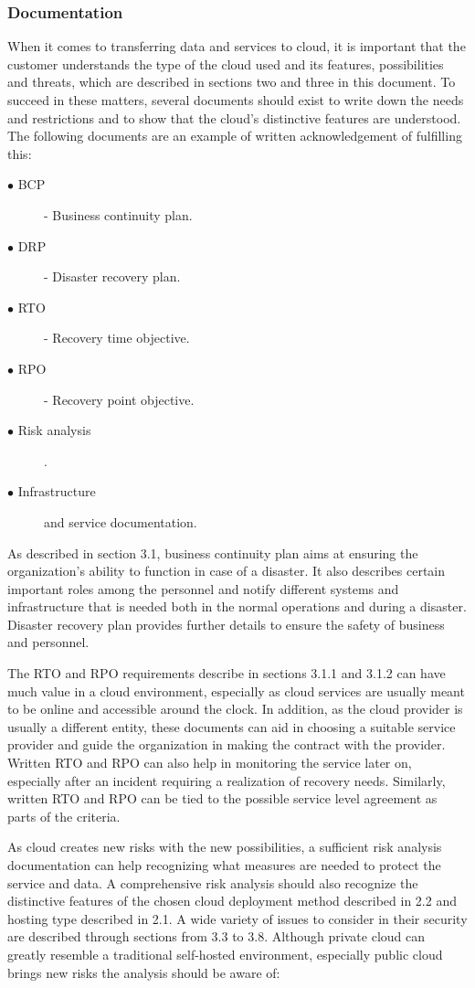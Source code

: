 \documentclass{article}
\begin{document}
\subsubsection{Documentation}
When it comes to transferring data and services to cloud, it is important that the customer understands the type of the cloud used and its features, possibilities and threats, which are described in sections two and three in this document. To succeed in these matters, several documents should exist to write down the needs and restrictions and to show that the cloud's distinctive features are understood. The following documents are an example of written acknowledgement of fulfilling this:
\begin{description}
	\item[$\bullet$ BCP] - Business continuity plan.
	\item[$\bullet$ DRP] - Disaster recovery plan.
	\item[$\bullet$ RTO] - Recovery time objective.
	\item[$\bullet$ RPO] - Recovery point objective.
	\item[$\bullet$ Risk analysis].
	\item[$\bullet$ Infrastructure] and service documentation.
\end{description}
\par
As described in section 3.1, business continuity plan aims at ensuring the organization's ability to function in case of a disaster. It also describes certain important roles among the personnel and notify different systems and infrastructure that is needed both in the normal operations and during a disaster. Disaster recovery plan provides further details to ensure the safety of business and personnel.
\par
The RTO and RPO requirements describe in sections 3.1.1 and 3.1.2 can have much value in a cloud environment, especially as cloud services are usually meant to be online and accessible around the clock. In addition, as the cloud provider is usually a different entity, these documents can aid in choosing a suitable service provider and guide the organization in making the contract with the provider. Written RTO and RPO can also help in monitoring the service later on, especially after an incident requiring a realization of recovery needs. Similarly, written RTO and RPO can be tied to the possible service level agreement as parts of the criteria.
\par
As cloud creates new risks with the new possibilities, a sufficient risk analysis documentation can help recognizing what measures are needed to protect the service and data. A comprehensive risk analysis should also recognize the distinctive features of the chosen cloud deployment method described in 2.2 and hosting type described in 2.1. A wide variety of issues to consider in their security are described through sections from 3.3 to 3.8. Although private cloud can greatly resemble a traditional self-hosted environment, especially public cloud brings new risks the analysis should be aware of:
\end{document}
